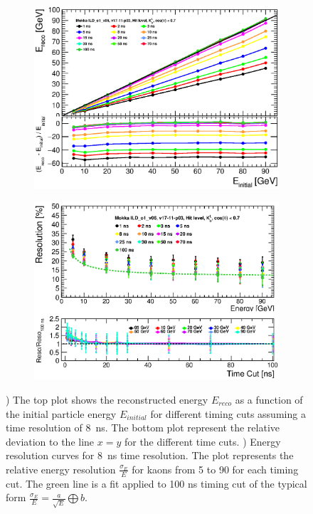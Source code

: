 \begin{figure}[htbp!]
  \centering
  \begin{subfigure}[t]{0.49\textwidth}
    \centering
    \includegraphics[width=1\linewidth]{../Thesis_Plots/ILD/Smearing_8ns/Plots/Linearity_TimeCuts_Smearing3.eps}
    \caption{} \label{fig:Lin8ns}
  \end{subfigure}
  \hfill
  \begin{subfigure}[t]{0.49\textwidth}
    \centering
    \includegraphics[width=1\linewidth]{../Thesis_Plots/ILD/Smearing_8ns/Plots/ShowerResoAbsolute_TimeCuts_Smearing3.eps}
    \caption{} \label{fig:Reso8ns}
  \end{subfigure}
  \caption{) The top plot shows the reconstructed energy $E_{reco}$ as a function of the initial particle energy $E_{initial}$ for different timing cuts assuming a time resolution of \SI{8}{\nano\second}. The bottom plot represent the relative deviation to the line $x=y$ for the different time cuts. ) Energy resolution curves for \SI{8}{\nano\second} time resolution. The plot represents the relative energy resolution $\frac{\sigma_{E}}{E}$ for kaons from 5 to 90 \GeV for each timing cut. The green line is a fit applied to 100 ns timing cut of the typical form $\frac{\sigma_{E}}{E} = \frac{a}{\sqrt{E}} \bigoplus b$.}
\end{figure}

